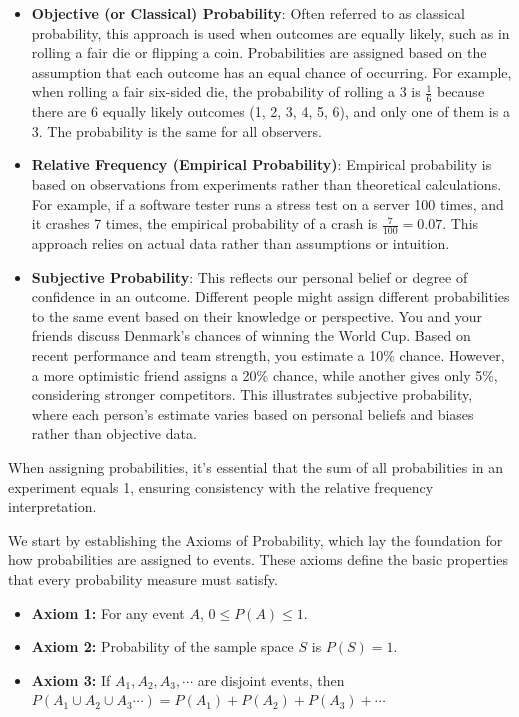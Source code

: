 \begin{itemize}
    \item \textbf{Objective (or Classical) Probability}: Often referred to as classical probability, this approach is used when outcomes are equally likely, such as in rolling a fair die or flipping a coin. Probabilities are assigned based on the assumption that each outcome has an equal chance of occurring. For example, when rolling a fair six-sided die, the probability of rolling a 3 is \( \frac{1}{6} \) because there are 6 equally likely outcomes (1, 2, 3, 4, 5, 6), and only one of them is a 3. The probability is the same for all observers.
        
    \item \textbf{Relative Frequency (Empirical Probability)}: Empirical probability is based on observations from experiments rather than theoretical calculations. For example, if a software tester runs a stress test on a server 100 times, and it crashes 7 times, the empirical probability of a crash is \( \frac{7}{100} = 0.07 \). This approach relies on actual data rather than assumptions or intuition.
        
    \item \textbf{Subjective Probability}: This reflects our personal belief or degree of confidence in an outcome. Different people might assign different probabilities to the same event based on their knowledge or perspective. You and your friends discuss Denmark’s chances of winning the World Cup. Based on recent performance and team strength, you estimate a 10\% chance. However, a more optimistic friend assigns a 20\% chance, while another gives only 5\%, considering stronger competitors. This illustrates subjective probability, where each person's estimate varies based on personal beliefs and biases rather than objective data.
    

\end{itemize}

When assigning probabilities, it’s essential that the sum of all probabilities in an experiment equals 1, ensuring consistency with the relative frequency interpretation.

We start by establishing the Axioms of Probability, which lay the foundation for how probabilities are assigned to events. These axioms define the basic properties that every probability measure must satisfy.
    
\begin{axiom}
    \begin{itemize}
        \item \textbf{Axiom 1:} For any event \(A\), \( 0 \leq P(A) \leq 1 \).
        \item \textbf{Axiom 2:} Probability of the sample space \(S\) is \(P(S) = 1\).
        \item \textbf{Axiom 3:} If \(A_1, A_2, A_3, \cdots\) are disjoint events, then \(P\left(A_1 \cup A_2 \cup A_3 \cdots\right) = P\left(A_1\right) + P\left(A_2\right) + P\left(A_3\right) + \cdots\)
    \end{itemize}
\end{axiom}

